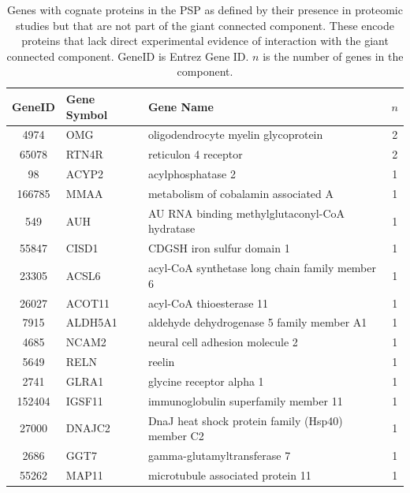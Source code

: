 
\begin{table}[ht]
\centering
\begin{tabular}{cllc}
\toprule
 
GeneID & Gene Symbol & Gene Name & $n$ \\ 
\midrule
 4974 & OMG & oligodendrocyte myelin glycoprotein & 2 \\ 
  65078 & RTN4R & reticulon 4 receptor & 2 \\ 
 98 & ACYP2 & acylphosphatase 2 & 1 \\ 
  166785 & MMAA & metabolism of cobalamin associated A & 1 \\ 
  549 & AUH & AU RNA binding methylglutaconyl-CoA hydratase & 1 \\ 
  55847 & CISD1 & CDGSH iron sulfur domain 1 & 1 \\ 
  23305 & ACSL6 & acyl-CoA synthetase long chain family member 6 & 1 \\ 
  26027 & ACOT11 & acyl-CoA thioesterase 11 & 1 \\ 
  7915 & ALDH5A1 & aldehyde dehydrogenase 5 family member A1 & 1 \\ 
  4685 & NCAM2 & neural cell adhesion molecule 2 & 1 \\ 
 
  5649 & RELN & reelin & 1 \\ 
  2741 & GLRA1 & glycine receptor alpha 1 & 1 \\ 
  152404 & IGSF11 & immunoglobulin superfamily member 11 & 1 \\ 
 
  27000 & DNAJC2 & DnaJ heat shock protein family (Hsp40) member C2 & 1 \\ 
  2686 & GGT7 & gamma-glutamyltransferase 7 & 1 \\ 
  55262 & MAP11 & microtubule associated protein 11 & 1 \\ 
   \bottomrule
\end{tabular}
\caption[Genes not in largest connected component]{Genes with cognate proteins in the PSP as defined by their presence in proteomic studies but that are not part of the giant connected component. These encode proteins that lack direct experimental evidence of interaction with the giant connected component. GeneID is Entrez Gene ID. $n$ is the number of genes in the component.} 
\label{table:notinLCC}
\end{table}

